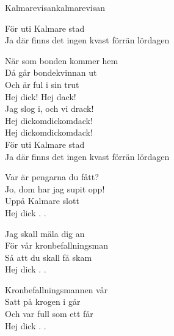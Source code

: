 \begin{song}{Kalmarevisan}{kalmarevisan}
\begin{vers}
För uti Kalmare stad\\
Ja där finns det ingen kvast förrän lördagen\\
\end{vers}
\begin{vers}
\repopen När som bonden kommer hem\\
Då går bondekvinnan ut \repclose\\
Och är ful i sin trut\\
Hej dick! Hej dack!\\
Jag slog i, och vi drack!\\
Hej dickomdickomdack!\\
Hej dickomdickomdack!\\
För uti Kalmare stad\\
Ja där finns det ingen kvast förrän lördagen\\
\end{vers}
\begin{vers}
\repopen Var är pengarna du fått?\\
Jo, dom har jag supit opp! \repclose\\
Uppå Kalmare slott\\
Hej dick . . \\
\end{vers}
\begin{vers}
\repopen Jag skall mäla dig an\\
För vår kronbefallningsman \repclose\\
Så att du skall få skam\\
Hej dick . . \\
\end{vers}
\begin{vers}
\repopen Kronbefallningsmannen vår\\
Satt på krogen i går \repclose\\
Och var full som ett får\\
Hej dick . . \\
\end{vers}
\end{song}
